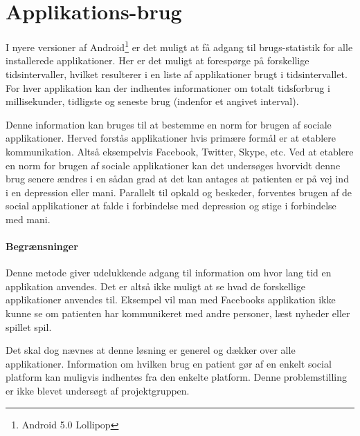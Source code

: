 \section{Applikations-brug}
I nyere versioner af Android\footnote{Android 5.0 Lollipop} er det muligt at få adgang til brugs-statistik for alle installerede applikationer.
Her er det muligt at forespørge på forskellige tidsintervaller, hvilket resulterer i en liste af applikationer brugt i tidsintervallet.
For hver applikation kan der indhentes informationer om totalt tidsforbrug i millisekunder, tidligste og seneste brug (indenfor et angivet interval).

Denne information kan bruges til at bestemme en norm for brugen af sociale applikationer.
Herved forstås applikationer hvis primære formål er at etablere kommunikation.
Altså eksempelvis Facebook, Twitter, Skype, etc.
Ved at etablere en norm for brugen af sociale applikationer kan det undersøges hvorvidt denne brug senere ændres i en sådan grad at det kan antages at patienten er på vej ind i en depression eller mani.
Parallelt til opkald og beskeder, forventes brugen af de social applikationer at falde i forbindelse med depression og stige i forbindelse med mani.

\paragraph{Begrænsninger}
Denne metode giver udelukkende adgang til information om hvor lang tid en applikation anvendes.
Det er altså ikke muligt at se hvad de forskellige applikationer anvendes til.
Eksempel vil man med Facebooks applikation ikke kunne se om patienten har kommunikeret med andre personer, læst nyheder eller spillet spil.

Det skal dog nævnes at denne løsning er generel og dækker over alle applikationer.
Information om hvilken brug en patient gør af en enkelt social platform kan muligvis indhentes fra den enkelte platform.
Denne problemstilling er ikke blevet undersøgt af projektgruppen.